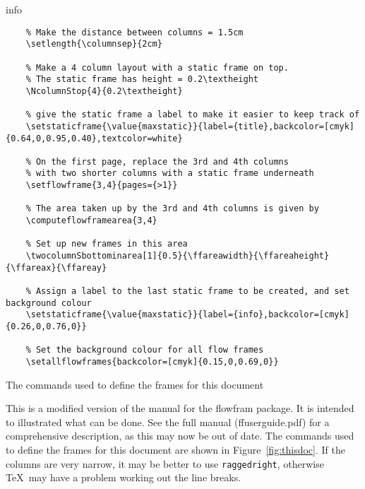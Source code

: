 \documentclass[a0]{a0poster}
\newcommand{\sty}[1]{\textsf{#1}}
\newcommand{\cmdname}[1]{\texttt{\symbol{92}#1}}
\begin{document}

\pagestyle{empty}

\begin{staticcontents*}{info}
\begin{staticfigure}

\begin{verbatim}
    % Make the distance between columns = 1.5cm
    \setlength{\columnsep}{2cm}

    % Make a 4 column layout with a static frame on top.
    % The static frame has height = 0.2\textheight
    \NcolumnStop{4}{0.2\textheight}

    % give the static frame a label to make it easier to keep track of
    \setstaticframe{\value{maxstatic}}{label={title},backcolor=[cmyk]{0.64,0,0.95,0.40},textcolor=white}

    % On the first page, replace the 3rd and 4th columns
    % with two shorter columns with a static frame underneath
    \setflowframe{3,4}{pages={>1}}

    % The area taken up by the 3rd and 4th columns is given by
    \computeflowframearea{3,4}

    % Set up new frames in this area
    \twocolumnSbottominarea[1]{0.5}{\ffareawidth}{\ffareaheight}{\ffareax}{\ffareay}

    % Assign a label to the last static frame to be created, and set background colour
    \setstaticframe{\value{maxstatic}}{label={info},backcolor=[cmyk]{0.26,0,0.76,0}}

    % Set the background colour for all flow frames
    \setallflowframes{backcolor=[cmyk]{0.15,0,0.69,0}}
\end{verbatim}

\caption{The commands used to define the frames for this document}
\protect\label{fig:thisdoc}
\end{staticfigure}
\end{staticcontents*}

This is a modified version of the manual for the \sty{flowfram}
package.  It is intended to illustrated what can be done. See the
full manual (ffuserguide.pdf) for
a comprehensive description, as this may now be out of date. The commands used to define the frames for
this document are shown in Figure~\ref{fig:thisdoc}.
If the columns are very narrow, it may be better to
use \cmdname{raggedright}, otherwise \TeX\ may have a
problem working out the line breaks.
\end{document}

